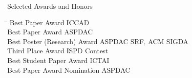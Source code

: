 
\begin{rSection}{Selected Awards and Honors}
\begin{tabbing}
\hspace{3.2in}\= \hspace{2.8in}\=\kill
    Best Paper Award                   \>ICCAD                         \\

    Best Paper Award                   \>ASPDAC                         \\

    Best Poster (Research) Award      \> ASPDAC SRF, ACM SIGDA        \\

    Third Place Award                 \> ISPD Contest        \\

    Best Student Paper Award                     \>ICTAI                         \\

    Best Paper Award Nomination                  \>ASPDAC                      

\end{tabbing}
\end{rSection}

